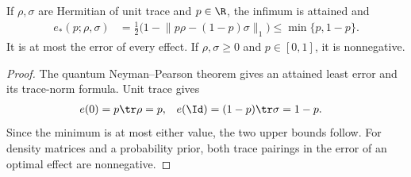 \begin{theorem}
    \label{thm:optimal_testing_error}
    \leanok
    If $\rho,\sigma$ are Hermitian of unit trace and $p\in\R$, the infimum is
    attained and
    \begin{align}
        e_*(p;\rho,\sigma)
          &=\tfrac12\bigl(1-\lVert p\rho-(1-p)\sigma\rVert_1\bigr)
          \le\min\{p,1-p\}.
    \end{align}
    It is at most the error of every effect. If $\rho,\sigma\ge0$ and
    $p\in[0,1]$, it is nonnegative.
\end{theorem}
\begin{proof}
    \leanok
    The quantum Neyman--Pearson theorem gives an attained least error and
    its trace-norm formula. Unit trace gives
    \begin{align}
        e(0)&=p\tr\rho=p, & e(\Id)&=(1-p)\tr\sigma=1-p.
    \end{align}
    Since the minimum is at most either value, the two upper bounds follow.
    For density matrices and a probability prior, both trace
    pairings in the error of an optimal effect are nonnegative.
\end{proof}

